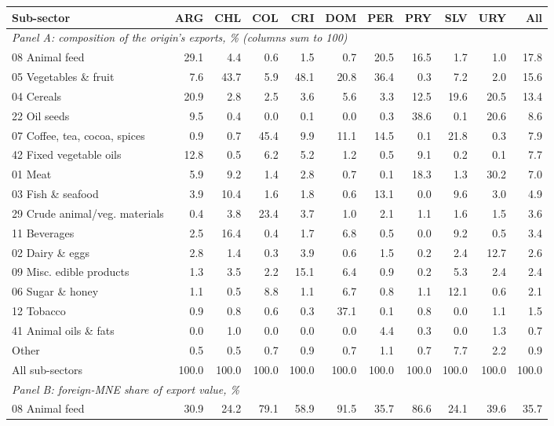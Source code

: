 \begin{tabular}{lrrrrrrrrrr}
\toprule
Sub-sector & ARG & CHL & COL & CRI & DOM & PER & PRY & SLV & URY & All \\
\midrule
\multicolumn{11}{l}{\textit{Panel A: composition of the origin's exports, \% (columns sum to 100)}} \\
08 Animal feed & 29.1 & 4.4 & 0.6 & 1.5 & 0.7 & 20.5 & 16.5 & 1.7 & 1.0 & 17.8 \\
05 Vegetables \& fruit & 7.6 & 43.7 & 5.9 & 48.1 & 20.8 & 36.4 & 0.3 & 7.2 & 2.0 & 15.6 \\
04 Cereals & 20.9 & 2.8 & 2.5 & 3.6 & 5.6 & 3.3 & 12.5 & 19.6 & 20.5 & 13.4 \\
22 Oil seeds & 9.5 & 0.4 & 0.0 & 0.1 & 0.0 & 0.3 & 38.6 & 0.1 & 20.6 & 8.6 \\
07 Coffee, tea, cocoa, spices & 0.9 & 0.7 & 45.4 & 9.9 & 11.1 & 14.5 & 0.1 & 21.8 & 0.3 & 7.9 \\
42 Fixed vegetable oils & 12.8 & 0.5 & 6.2 & 5.2 & 1.2 & 0.5 & 9.1 & 0.2 & 0.1 & 7.7 \\
01 Meat & 5.9 & 9.2 & 1.4 & 2.8 & 0.7 & 0.1 & 18.3 & 1.3 & 30.2 & 7.0 \\
03 Fish \& seafood & 3.9 & 10.4 & 1.6 & 1.8 & 0.6 & 13.1 & 0.0 & 9.6 & 3.0 & 4.9 \\
29 Crude animal/veg. materials & 0.4 & 3.8 & 23.4 & 3.7 & 1.0 & 2.1 & 1.1 & 1.6 & 1.5 & 3.6 \\
11 Beverages & 2.5 & 16.4 & 0.4 & 1.7 & 6.8 & 0.5 & 0.0 & 9.2 & 0.5 & 3.4 \\
02 Dairy \& eggs & 2.8 & 1.4 & 0.3 & 3.9 & 0.6 & 1.5 & 0.2 & 2.4 & 12.7 & 2.6 \\
09 Misc. edible products & 1.3 & 3.5 & 2.2 & 15.1 & 6.4 & 0.9 & 0.2 & 5.3 & 2.4 & 2.4 \\
06 Sugar \& honey & 1.1 & 0.5 & 8.8 & 1.1 & 6.7 & 0.8 & 1.1 & 12.1 & 0.6 & 2.1 \\
12 Tobacco & 0.9 & 0.8 & 0.6 & 0.3 & 37.1 & 0.1 & 0.8 & 0.0 & 1.1 & 1.5 \\
41 Animal oils \& fats & 0.0 & 1.0 & 0.0 & 0.0 & 0.0 & 4.4 & 0.3 & 0.0 & 1.3 & 0.7 \\
Other & 0.5 & 0.5 & 0.7 & 0.9 & 0.7 & 1.1 & 0.7 & 7.7 & 2.2 & 0.9 \\
All sub-sectors & 100.0 & 100.0 & 100.0 & 100.0 & 100.0 & 100.0 & 100.0 & 100.0 & 100.0 & 100.0 \\
\midrule
\multicolumn{11}{l}{\textit{Panel B: foreign-MNE share of export value, \%}} \\
08 Animal feed & 30.9 & 24.2 & 79.1 & 58.9 & 91.5 & 35.7 & 86.6 & 24.1 & 39.6 & 35.7 \\

\end{tabular}
